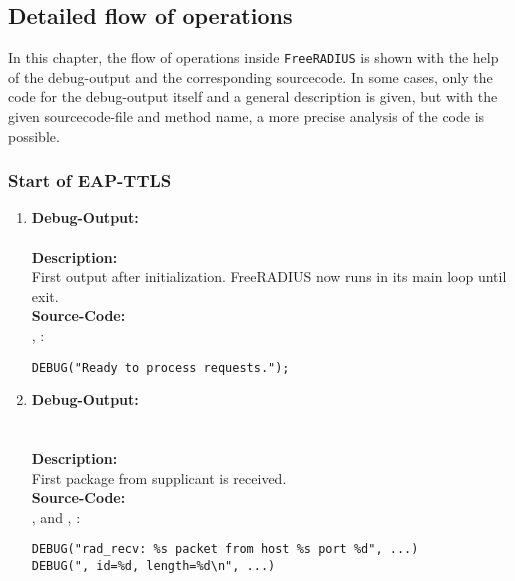 \subsection{Detailed flow of operations}
In this chapter, the flow of operations inside \texttt{FreeRADIUS} is shown with the help of the debug-output and the corresponding sourcecode.
In some cases, only the code for the debug-output itself and a general description is given, but with the given sourcecode-file and method name, a more precise analysis of the code is possible.

\subsubsection*{Start of EAP-TTLS}
\label{section:start_of_eap_ttls}
\begin{enumerate}
\item \textbf{Debug-Output:}\\
\\
\newline
\textbf{Description:}\\
First output after initialization. FreeRADIUS now runs in its main loop until exit.\\
\newline
\textbf{Source-Code:}\\
, :
\begin{lstlisting}
DEBUG("Ready to process requests.");
\end{lstlisting}

\item \textbf{Debug-Output:}\\
\\
\\
\newline
\textbf{Description:}\\
First package from supplicant is received.\\
\newline
\textbf{Source-Code:}\\
,  and , :
\begin{lstlisting}
DEBUG("rad_recv: %s packet from host %s port %d", ...)
DEBUG(", id=%d, length=%d\n", ...)
\end{lstlisting}

\newpage


\end{enumerate}
